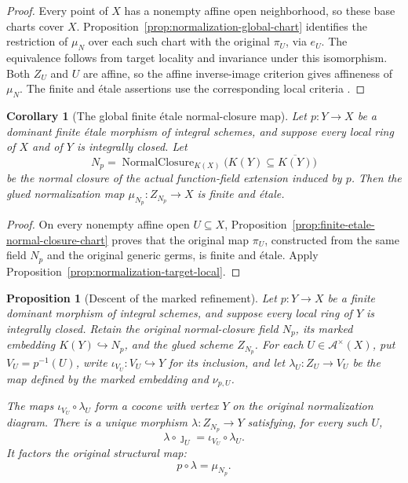 \documentclass[11pt]{article}
\newtheorem{proposition}[theorem]{Proposition}
\newtheorem{corollary}[theorem]{Corollary}
\theoremstyle{definition}
\theoremstyle{remark}
\begin{document}
\begin{proof}
Every point of \(X\) has a nonempty affine open neighborhood, so these
base charts cover \(X\). Proposition~\ref{prop:normalization-global-chart}
identifies the restriction of \(\mu_N\) over each such chart with the
original \(\pi_U\), via \(e_U\). The equivalence follows from target
locality and invariance under this isomorphism. Both \(Z_U\) and \(U\)
are affine, so the affine inverse-image criterion gives affineness of
\(\mu_N\). The finite and \'{e}tale assertions use the corresponding
local criteria \cite{StacksAffineTargetLocal,StacksFiniteTargetLocal,StacksEtaleLocality}.
\end{proof}

\begin{corollary}[The global finite \'{e}tale normal-closure map]
\label{cor:normal-closure-global-finite-etale}
Let \(p:Y\to X\) be a dominant finite \'{e}tale morphism of integral
schemes, and suppose every local ring of \(X\) and of \(Y\) is
integrally closed. Let
\[
 N_p=\operatorname{NormalClosure}_{K(X)}
       \bigl(K(Y)\subseteq\overline{K(Y)}\bigr)
\]
be the normal closure of the actual function-field extension induced by
\(p\). Then the glued normalization map
\(\mu_{N_p}:Z_{N_p}\to X\) is finite and \'{e}tale.
\end{corollary}

\begin{proof}
On every nonempty affine open \(U\subseteq X\),
Proposition~\ref{prop:finite-etale-normal-closure-chart} proves that the
original map \(\pi_U\), constructed from the same field \(N_p\)
and the original generic germs, is finite and \'{e}tale. Apply
Proposition~\ref{prop:normalization-target-local}.
\end{proof}

\begin{proposition}[Descent of the marked refinement]
\label{prop:normal-closure-marked-refinement}
Let \(p:Y\to X\) be a finite dominant morphism of integral schemes,
and suppose every local ring of \(Y\) is integrally closed. Retain
the original normal-closure field \(N_p\), its marked embedding
\(K(Y)\hookrightarrow N_p\), and the glued scheme \(Z_{N_p}\).
For each \(U\in\mathcal A^{\times}(X)\), put \(V_U=p^{-1}(U)\),
write \(\iota_{V_U}:V_U\hookrightarrow Y\) for its inclusion, and let
\(\lambda_U:Z_U\to V_U\) be the map defined by the marked embedding
and \(\nu_{p,U}\).

The maps \(\iota_{V_U}\circ\lambda_U\) form a cocone with vertex
\(Y\) on the original normalization diagram. There is a unique
morphism \(\lambda:Z_{N_p}\to Y\) satisfying, for every such \(U\),
\[
 \lambda\circ\jmath_U=\iota_{V_U}\circ\lambda_U.
\]
It factors the original structural map:
\[
 p\circ\lambda=\mu_{N_p}.
\]
\end{proposition}
\end{document}
